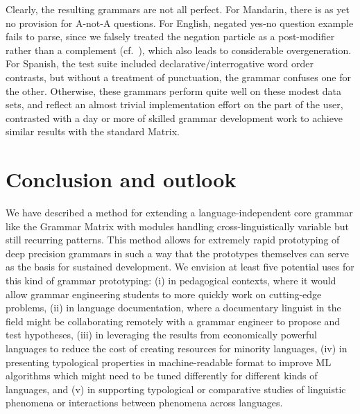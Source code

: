 Clearly, the resulting grammars are not all perfect.  For Mandarin,
there is as yet no provision for A-not-A questions.  For
English, negated yes-no question example fails to
parse, since we falsely treated the negation particle as a post-modifier
rather than a complement (cf.\ ),
which also leads to considerable overgeneration. For Spanish, the
test suite included declarative/interrogative word order contrasts, but
without a treatment of punctuation, the grammar confuses one for the other.
Otherwise, these grammars perform quite well on these modest data sets,
and reflect an almost trivial implementation effort on the part of the user,
contrasted with a day or more of skilled grammar development work to 
achieve similar results with the standard Matrix.

\section{Conclusion and outlook}

We have described a method for extending a language-independent core
grammar like the Grammar Matrix with modules handling
cross-linguistically variable but still recurring patterns.  This
method allows for extremely rapid prototyping of deep precision
grammars in such a way that the prototypes themselves can serve as the
basis for sustained development.  We envision at least five potential
uses for this kind of grammar prototyping: (i) in pedagogical
contexts, where it would allow grammar engineering students to more
quickly work on cutting-edge problems, (ii) in language documentation,
where a documentary linguist in the field might be collaborating
remotely with a grammar engineer to propose and test hypotheses, (iii)
in leveraging the results from economically powerful languages to
reduce the cost of creating resources for minority languages, (iv) in
presenting typological properties in machine-readable format to
improve ML algorithms which might need to be tuned differently for
different kinds of languages, and (v) in supporting typological or
comparative studies of linguistic phenomena or interactions between
phenomena across languages.


%






